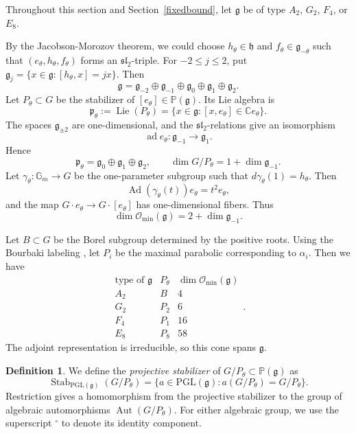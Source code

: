 \documentclass[12pt]{article}
\theoremstyle{definition}
\newtheorem{definition}[theorem]{Definition}
\DeclareMathOperator{\Ad}{Ad}
\DeclareMathOperator{\ad}{ad}
\DeclareMathOperator{\Aut}{Aut}
\DeclareMathOperator{\Stab}{Stab}
\newcommand{\C}{\mathbb C}
\newcommand{\Gm}{\mathbb G_m}
\newcommand{\PGL}{\mathrm{PGL}}
\newcommand{\PP}{\mathbb P}
\newcommand{\Lieg}{\mathfrak{g}}
\newcommand{\h}{\mathfrak h}
\newcommand{\Omin}{\mathcal O_{\min}}
\begin{document}
Throughout this section and Section~\ref{fixedbound}, let $\Lieg$ be of type $A_2$, $G_2$, $F_4$, or $E_8$.

By the Jacobson-Morozov theorem, we could choose $h_\theta\in\h$ and $f_\theta\in\Lieg_{-\theta}$ such that $(e_\theta,h_\theta,f_\theta)$ forms an $\mathfrak{sl}_2$-triple.  For $-2\le j\le2$, put
$
    \Lieg_j=\{x\in\Lieg:[h_\theta,x]=jx\}.
$
Then
\[
    \Lieg=\Lieg_{-2}\oplus\Lieg_{-1}\oplus\Lieg_0
    \oplus\Lieg_1\oplus\Lieg_2.
\]
Let $P_\theta\subset G$ be the stabilizer of $[e_\theta]\in\mathbb{P}(\Lieg)$. Its Lie algebra is
\[
    \mathfrak p_\theta:=\operatorname{Lie}(P_\theta)
    =\{x\in\Lieg:[x,e_\theta]\in\C e_\theta\}.
\]
The spaces $\Lieg_{\pm2}$ are one-dimensional, and the $\mathfrak{sl}_2$-relations give an isomorphism \[\ad e_\theta:\Lieg_{-1}\to\Lieg_1.\] Hence
\[
    \mathfrak p_\theta=\Lieg_0\oplus\Lieg_1\oplus\Lieg_2,
    \qquad
    \dim G/P_\theta=1+\dim\Lieg_{-1}.
\]
Let $\gamma_\theta:\Gm\to G$ be the one-parameter subgroup such that $d\gamma_\theta(1)=h_\theta$.
Then $$\Ad(\gamma_\theta(t))e_\theta=t^2e_\theta,$$ and the map $G\cdot e_\theta\to G\cdot[e_\theta]$ has one-dimensional fibers. Thus
\[
    \dim\Omin(\Lieg)=2+\dim\Lieg_{-1}.
\]

Let $B\subset G$ be the Borel subgroup determined by the positive roots. Using the Bourbaki labeling \cite[Planches I and VII--IX]{Bourbaki}, let $P_i$ be the maximal parabolic corresponding to $\alpha_i$. Then we have
\[
    \begin{array}{c|c|c}
    \text{type of }\Lieg&P_\theta&\dim\Omin(\Lieg)\\ \hline
    A_2&B&4\\
    G_2&P_2&6\\
    F_4&P_1&16\\
    E_8&P_8&58
    \end{array}.
\]
The adjoint representation is irreducible, so this cone spans $\Lieg$.



\begin{definition}
  We define the \emph{projective stabilizer} of $G/P_\theta\subset\PP(\Lieg)$ as 
    \[
        \Stab_{\PGL(\Lieg)}(G/P_\theta)
        =\{a\in\PGL(\Lieg):a(G/P_\theta)=G/P_\theta\}.
    \]
    Restriction gives a homomorphism from the projective stabilizer to the group of algebraic automorphisms $\Aut(G/P_\theta)$.
    For either algebraic group, we use the superscript ${}^\circ$ to denote its identity component.
\end{definition}
\end{document}
